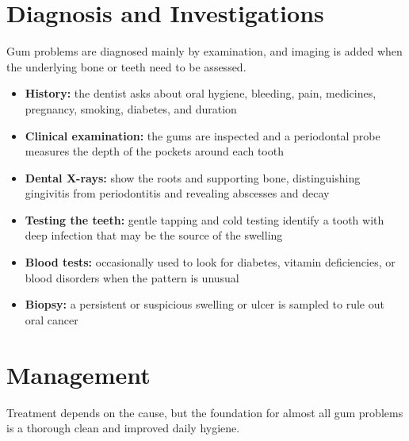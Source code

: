 \section*{Diagnosis and Investigations}
Gum problems are diagnosed mainly by examination, and imaging is added when the underlying bone or teeth need to be assessed.

\begin{itemize}
    \item \textbf{History:} the dentist asks about oral hygiene, bleeding, pain, medicines, pregnancy, smoking, diabetes, and duration
    \item \textbf{Clinical examination:} the gums are inspected and a periodontal probe measures the depth of the pockets around each tooth
    \item \textbf{Dental X-rays:} show the roots and supporting bone, distinguishing gingivitis from periodontitis and revealing abscesses and decay
    \item \textbf{Testing the teeth:} gentle tapping and cold testing identify a tooth with deep infection that may be the source of the swelling
    \item \textbf{Blood tests:} occasionally used to look for diabetes, vitamin deficiencies, or blood disorders when the pattern is unusual
    \item \textbf{Biopsy:} a persistent or suspicious swelling or ulcer is sampled to rule out oral cancer
\end{itemize}

\section*{Management}
Treatment depends on the cause, but the foundation for almost all gum problems is a thorough clean and improved daily hygiene.

